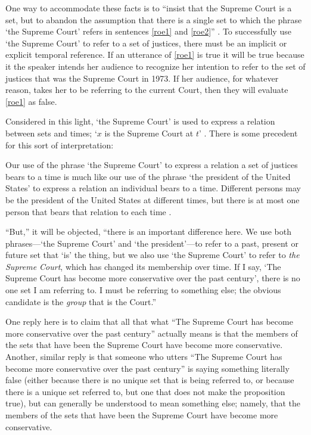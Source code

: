\documentclass[12pt,twoside]{reedfancy}
\newenvironment{squote}{%
	\begin{spacing}{1}
	\begin{list}{}{%
	\setlength{\labelwidth}{0pt}%
	\rightmargin\leftmargin%
	}
	\item\relax
	}{%
	\end{list}%
	\end{spacing}
	}
\begin{document}
\begin{spacing}{1.25}
One way to accommodate these facts is to ``insist that the Supreme
Court is a set, but to abandon the assumption that there is a single
set to which the phrase `the Supreme Court' refers in sentences
\ref{roe1} and \ref{roe2}'' \citep[138]{uzquiano2004a}.  To
successfully use `the Supreme Court' to refer to a set of justices,
there must be an implicit or explicit temporal reference.  If an
utterance of \ref{roe1} is true it will be true because it the speaker
intends her audience to recognize her intention to refer to the set of
justices that was the Supreme Court in 1973.  If her audience, for
whatever reason, takes her to be referring to the current Court, then
they will evaluate \ref{roe1} as false.

Considered in this light, `the Supreme Court' is used to express a
relation between sets and times; `$x$ is the Supreme Court at $t$'
\citep[140]{uzquiano2004a}.  There is some precedent for this sort of
interpretation:

\begin{squote}
Our use of the phrase `the Supreme Court' to express a relation a set
of justices bears to a time is much like our use of the phrase `the
president of the United States' to express a relation an individual
bears to a time.  Different persons may be the president of the United
States at different times, but there is at most one person that bears
that relation to each time \citep[138]{uzquiano2004a}.
\end{squote}

``But,'' it will be objected, ``there is an important difference here.
We use both phrases---`the Supreme Court' and `the president'---to
refer to a past, present or future set that `is' the thing, but we
also use `the Supreme Court' to refer to {\em the Supreme Court},
which has changed its membership over time.  If I say, `The Supreme
Court has become more conservative over the past century', there is no
one set I am referring to.  I must be referring to something else; the
obvious candidate is the {\em group} that is the Court.''

One reply here is to claim that all that what ``The Supreme Court has
become more conservative over the past century'' actually means is
that the members of the sets that have been the Supreme Court have
become more conservative.  Another, similar reply is that someone who
utters ``The Supreme Court has become more conservative over the past
century'' is saying something literally false (either because there is
no unique set that is being referred to, or because there is a unique
set referred to, but one that does not make the proposition true), but
can generally be understood to mean something else; namely, that the
members of the sets that have been the Supreme Court have become more
conservative.


\end{spacing}
\end{document}
